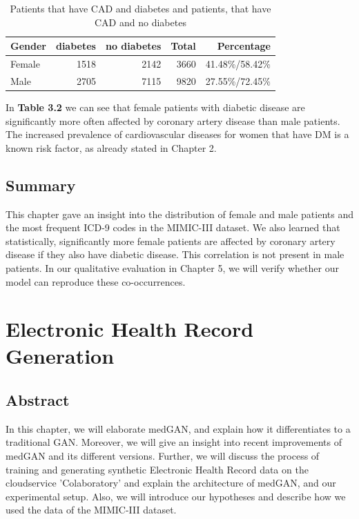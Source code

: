 \documentclass[11pt, a4paper, oneside]{book}
\begin{document}
\begin{table}
\begin{center}
\begin{tabularx}{\textwidth}{X|r|r|r|r}
Gender & diabetes & no diabetes & Total & Percentage\\
\hline
Female & 1518 & 2142 & 3660 & 41.48\%/58.42\%\\
Male 	& 2705 & 7115 & 9820 & 27.55\%/72.45\%\\
\end{tabularx}
\caption{\label{tab:cad-diabetic}Patients that have CAD and diabetes and patients, that have CAD and no diabetes}
\end{center}
\end{table}


In \textbf{Table 3.2} we can see that female patients with diabetic disease are significantly more often affected by coronary artery disease than male patients. The increased prevalence of cardiovascular diseases for women that have DM is a known risk factor, as already stated in Chapter 2.


\section{Summary}
This chapter gave an insight into the distribution of female and male patients and the most frequent ICD-9 codes in the MIMIC-III dataset. We also learned that statistically, significantly more female patients are affected by coronary artery disease if they also have diabetic disease. This correlation is not present in male patients.  
In our qualitative evaluation in Chapter 5, we will verify whether our model can reproduce these co-occurrences.

\chapter{Electronic Health Record Generation}
\section{Abstract}
In this chapter, we will elaborate medGAN, and explain how it differentiates to a traditional GAN. Moreover, we will give an insight into recent improvements of medGAN and its different versions. Further, we will discuss the process of training and generating synthetic Electronic Health Record data on the cloudservice 'Colaboratory' and explain the architecture of medGAN, and our experimental setup. Also, we will introduce our hypotheses and describe how we used the data of the MIMIC-III dataset.
\end{document}
